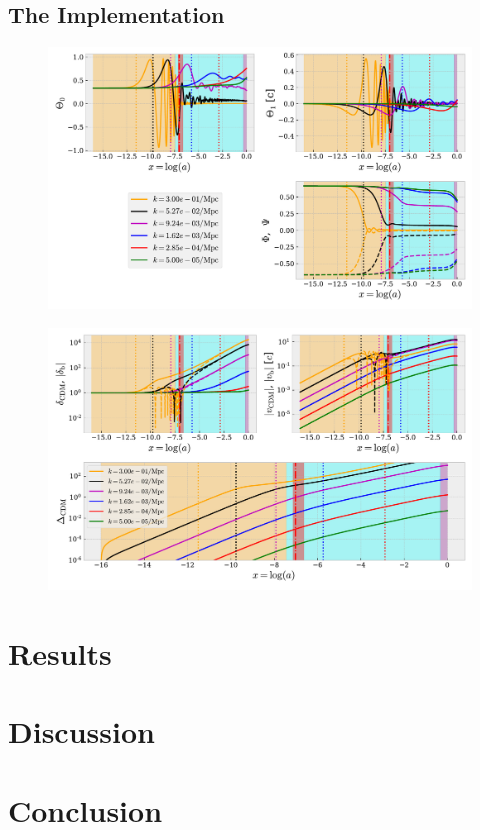 \documentclass[twocolumn]{aastex62}
\begin{document}
\subsection{The Implementation} \label{subsec:implementation}

\begin{figure}
    \includegraphics[scale = 0.65]{Figures/fig1.pdf}
    \caption{} 
    \label{fig:fig1}
\end{figure}

\begin{figure}
    \includegraphics[scale = 0.65]{Figures/fig2.pdf}
    \caption{}
    \label{fig:fig2}
\end{figure}

\section{Results}\label{sec:Results}

\section{Discussion}\label{sec:Discussion}

\section{Conclusion} \label{sec:Conclusion}

\newpage


\end{document}
